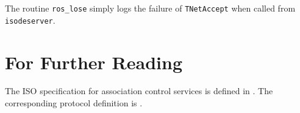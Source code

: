 The routine \verb"ros_lose" simply logs the failure of \verb"TNetAccept" when
called from \verb"isodeserver".
{\let\small=\scriptsize			%
\clearpage
{}
\clearpage
{}\empty
\clearpage
{}\empty
\clearpage
{}\empty}

\section	{For Further Reading}
The ISO specification for association control services is defined in
\cite{ISO.ACS.Service}.
The corresponding protocol definition is \cite{ISO.ACS.Protocol}.


